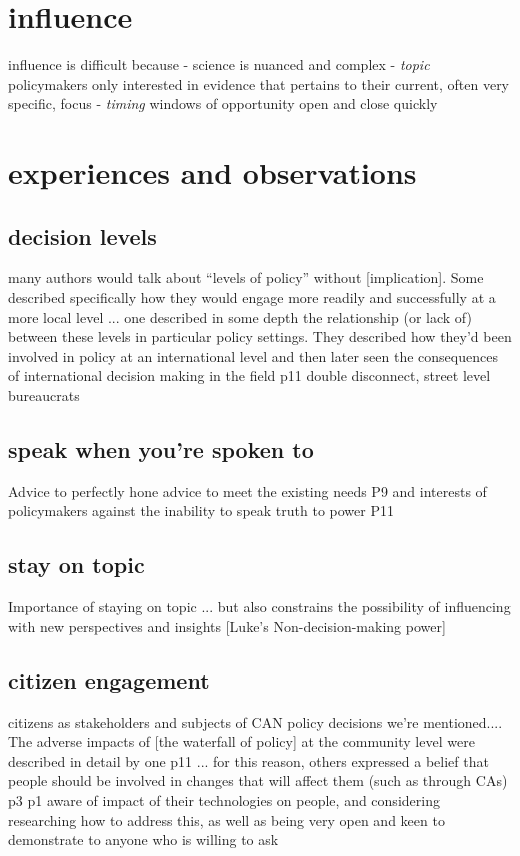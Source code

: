 \section{influence}
influence is difficult because
- \emph{} science is nuanced and complex
- \emph{topic} policymakers only interested in evidence that pertains to their current, often very specific, focus
- \emph{timing} windows of opportunity open and close quickly

\section{experiences and observations}
\subsection{decision levels}
many authors would talk about ``levels of policy'' without [implication]. Some described specifically how they would engage more readily and successfully at a more local level ... one described in some depth the relationship (or lack of) between these levels in particular policy settings. They described how they'd been involved in policy at an international level and then later seen the consequences of international decision making in the field p11 double disconnect, street level bureaucrats

\subsection{speak when you're spoken to}
Advice to perfectly hone advice to meet the existing needs P9 and interests of policymakers against the inability to speak truth to power P11

\subsection{stay on topic}
Importance of staying on topic ... but also constrains the possibility of influencing with new perspectives and insights [Luke's Non-decision-making power]

\subsection{citizen engagement}
citizens as stakeholders and subjects of CAN policy decisions we're mentioned.... The adverse impacts of [the waterfall of policy] at the community level were described in detail by one p11 ... for this reason, others expressed a belief that people should be involved in changes that will affect them (such as through CAs) p3  p1 aware of impact of their technologies on people, and considering researching how to address this, as well as being very open and keen to demonstrate to anyone who is willing to ask


